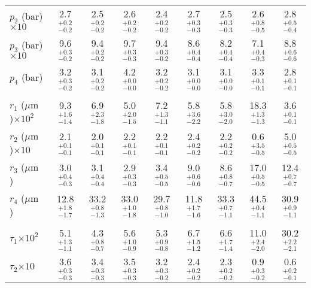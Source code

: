 \documentclass[article,11pt]{emulateapj}
\def\mum{$\mu$m }
\begin{document}
\begin{table*}[!htb]
\begin{footnotesize}
\begin{tabular}{|l|c c c c|c c c c|}
 $p_2$ (bar)$\times 10$ &   2.7$^{+  0.2}_{-  0.2}$ &   2.5$^{+ 0.2}_{- 0.2}$ &   2.6$^{+ 0.2}_{- 0.2}$ &   2.4$^{+ 0.2}_{- 0.2}$ &   2.7$^{+ 0.3}_{- 0.3}$ &   2.5$^{+ 0.3}_{- 0.3}$ &   2.6$^{+ 0.8}_{- 0.5}$ &   2.8$^{+ 0.5}_{- 0.4}$\\[0.05in]
 $p_3$ (bar)$\times 10$ &   9.6$^{+  0.3}_{-  0.2}$ &   9.4$^{+ 0.2}_{- 0.2}$ &   9.7$^{+ 0.3}_{- 0.3}$ &   9.4$^{+ 0.3}_{- 0.2}$ &   8.6$^{+ 0.4}_{- 0.4}$ &   8.2$^{+ 0.4}_{- 0.4}$ &   7.1$^{+ 0.4}_{- 0.3}$ &   8.8$^{+ 0.6}_{- 0.6}$\\[0.05in]
              $p_4$ (bar) &   3.2$^{+  0.3}_{-  0.2}$ &   3.1$^{+ 0.2}_{- 0.2}$ &   4.2$^{+ 0.0}_{- 0.0}$ &   3.2$^{+ 0.2}_{- 0.2}$ &   3.1$^{+ 0.0}_{- 0.0}$ &   3.1$^{+ 0.0}_{- 0.0}$ &   3.3$^{+ 0.1}_{- 0.1}$ &   2.8$^{+ 0.1}_{- 0.1}$\\[0.05in]
\hline\\[-0.1in]
$r_1$ (\mum)$\times 10^2$ &   9.3$^{+  1.6}_{-  1.4}$ &   6.9$^{+ 2.3}_{- 1.8}$ &   5.0$^{+ 2.0}_{- 1.5}$ &   7.2$^{+ 1.3}_{- 1.1}$ &   5.8$^{+ 3.6}_{- 2.2}$ &   5.8$^{+ 3.0}_{- 2.0}$ &  18.3$^{+ 1.3}_{- 1.3}$ &   3.6$^{+ 0.1}_{- 0.1}$\\[0.05in]
$r_2$ (\mum)$\times 10$ &   2.1$^{+  0.1}_{-  0.1}$ &   2.0$^{+ 0.1}_{- 0.1}$ &   2.2$^{+ 0.1}_{- 0.1}$ &   2.2$^{+ 0.1}_{- 0.1}$ &   2.4$^{+ 0.2}_{- 0.2}$ &   2.2$^{+ 0.2}_{- 0.2}$ &   0.6$^{+ 3.5}_{- 0.5}$ &   5.0$^{+ 0.5}_{- 0.5}$\\[0.05in]
             $r_3$ (\mum) &   3.0$^{+  0.4}_{-  0.3}$ &   3.1$^{+ 0.4}_{- 0.4}$ &   2.9$^{+ 0.3}_{- 0.3}$ &   3.4$^{+ 0.5}_{- 0.5}$ &   9.0$^{+ 0.6}_{- 0.6}$ &   8.6$^{+ 0.8}_{- 0.7}$ &  17.0$^{+ 0.5}_{- 0.5}$ &  12.4$^{+ 0.7}_{- 0.7}$\\[0.05in]
             $r_4$ (\mum) &  12.8$^{+  1.8}_{-  1.7}$ &  33.2$^{+ 0.8}_{- 1.3}$ &  33.0$^{+ 1.0}_{- 1.8}$ &  29.7$^{+ 0.8}_{- 1.0}$ &  11.8$^{+ 1.7}_{- 1.6}$ &  33.3$^{+ 0.7}_{- 1.1}$ &  44.5$^{+ 0.4}_{- 1.1}$ &  30.9$^{+ 0.9}_{- 1.1}$\\[0.05in]
\hline\\[-0.1in]
    $\tau_1$$\times 10^2$ &   5.1$^{+  1.3}_{-  1.1}$ &   4.3$^{+ 0.8}_{- 0.7}$ &   5.6$^{+ 1.0}_{- 0.9}$ &   5.3$^{+ 0.9}_{- 0.8}$ &   6.7$^{+ 1.5}_{- 1.2}$ &   6.6$^{+ 1.7}_{- 1.4}$ &  11.0$^{+ 2.4}_{- 2.0}$ &  30.2$^{+ 2.2}_{- 2.1}$\\[0.05in]
    $\tau_2$$\times 10$ &   3.6$^{+  0.3}_{-  0.3}$ &   3.4$^{+ 0.3}_{- 0.3}$ &   3.5$^{+ 0.3}_{- 0.3}$ &   3.2$^{+ 0.3}_{- 0.2}$ &   2.4$^{+ 0.2}_{- 0.2}$ &   2.3$^{+ 0.2}_{- 0.2}$ &   0.9$^{+ 0.3}_{- 0.2}$ &   0.6$^{+ 0.2}_{- 0.1}$\\[0.05in]

\end{tabular}
\end{footnotesize}
\end{table*}
\end{document}
